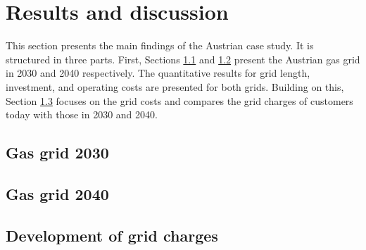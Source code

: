 \section{Results and discussion}\label{results}
This section presents the main findings of the Austrian case study. It is structured in three parts. First, Sections \ref{res_grid2030} and \ref{res_grid2040} present the Austrian gas grid in 2030 and 2040 respectively. The quantitative results for grid length, investment, and operating costs are presented for both grids. Building on this, Section \ref{res_grid_charges} focuses on the grid costs and compares the grid charges of customers today with those in 2030 and 2040. 

\subsection{Gas grid 2030}\label{res_grid2030}




\subsection{Gas grid 2040}\label{res_grid2040}

\subsection{Development of grid charges}\label{res_grid_charges}




